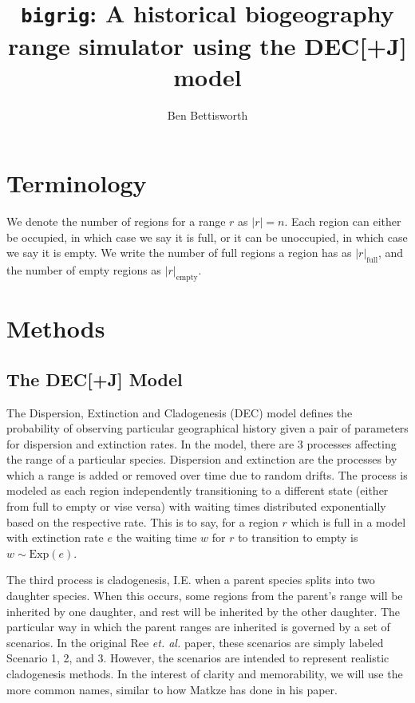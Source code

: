\documentclass{article}
\title{\texttt{bigrig}: A historical biogeography range simulator using the
	DEC[+J] model}
\author{Ben Bettisworth}
\begin{document}
\newcommand{\CountFull}[1]{|#1|_\text{full}}
\newcommand{\CountEmpty}[1]{|#1|_\text{empty}}

\maketitle

\section{Terminology}

We denote the number of regions for a range \( r \) as \( |r| = n\).
Each region can either be occupied, in which case we say it is full, or it can
be unoccupied, in which case we say it is empty.
We write the number of full regions a region has as \( \CountFull{r} \), and
the number of empty regions as \( \CountEmpty{r} \).

\section{Methods}

\subsection{The DEC[+J] Model} \label{sec:model}

The Dispersion, Extinction and Cladogenesis (DEC) model defines the probability
of observing particular geographical history given a pair of parameters for
dispersion and extinction rates.
In the model, there are 3 processes affecting the range of a particular
species.
Dispersion and extinction are the processes by which a range is added or
removed over time due to random drifts.
The process is modeled as each region independently transitioning to a
different state (either from full to empty or vise versa) with waiting times
distributed exponentially based on the respective rate.
This is to say, for a region \( r \) which is full in a model with extinction
rate \( e \) the waiting time \( w \) for \( r \) to transition to empty is \(
w \sim \text{Exp}(e) \).

The third process is cladogenesis, I.E. when a parent species splits into two
daughter species.
When this occurs, some regions from the parent's range will be inherited by one
daughter, and rest will be inherited by the other daughter.
The particular way in which the parent ranges are inherited is governed by a
set of scenarios.
In the original Ree \textit{et. al.}\cite{ALikelihoodFrReeR2005} paper, these
scenarios are simply labeled Scenario 1, 2, and 3.
However, the scenarios are intended to represent realistic cladogenesis
methods.
In the interest of clarity and memorability, we will use the more common names,
similar to how Matkze \cite{ModelSelectionMatzke2014} has done in his paper.
\end{document}
